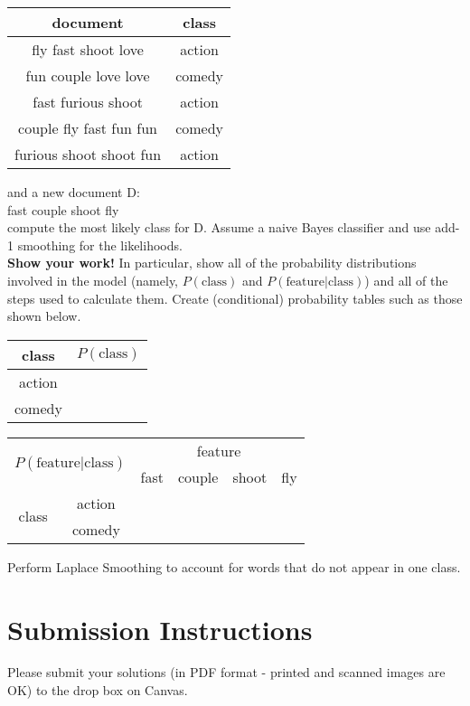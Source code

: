 \documentclass[11pt,letterpaper]{article}
\begin{document}
\begin{center}
\begin{tabular}{|c|c|}
\hline 
document & class \\ 
\hline 
fly fast shoot love & action \\ 
\hline 
fun couple love love & comedy \\ 
\hline 
fast furious shoot & action \\ 
\hline 
couple fly fast fun fun & comedy \\ 
\hline 
furious shoot shoot fun & action \\ 
\hline 
\end{tabular} 
\end{center}

\noindent and a new document D:\\

fast couple shoot fly\\

\noindent compute the most likely class for D. Assume a naive Bayes classifier and use add-1 smoothing for the likelihoods.\\

\noindent \textbf{Show your work!} In particular, show all of the probability distributions involved in the model (namely, $P(\mathrm{class})$ and $P(\mathrm{feature|class})$) and all of the steps used to calculate them. Create (conditional) probability tables such as those shown below.

\begin{center}
\begin{tabular}{|c|c|}
\hline 
class & $P(\mathrm{class})$ \\ 
\hline 
action &  \\ 
\hline 
comedy &  \\ 
\hline 
\end{tabular} 
\end{center}

\begin{center}
\begin{tabular}{|c|c|c|c|c|c|}
\hline 
\multicolumn{2}{|c|}{\multirow{2}{*}{$P(\mathrm{feature|class})$}} & \multicolumn{4}{|c|}{feature} \\ 
\cline{3-6}
\multicolumn{2}{|c|}{} & fast & couple & shoot & fly \\ 
\hline 
\multirow{2}{*}{class} & action &  &  &  & \\ 
\cline{2-6}
& comedy &  &  &  & \\ 
\hline
\end{tabular} 
\end{center}

Perform Laplace Smoothing to account for words that do not appear in one class.

\section*{Submission Instructions}

Please submit your solutions (in PDF format - printed and scanned images are OK) to the drop box on Canvas.
\end{document}
